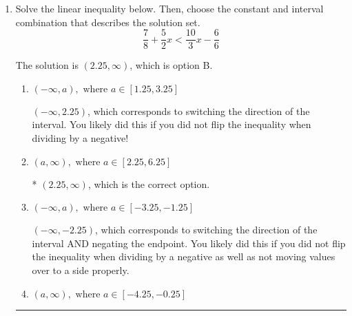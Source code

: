 \documentclass{extbook}[14pt]
\newcommand{\litem}[1]{\item #1

\rule{\textwidth}{0.4pt}}
\begin{document}
\begin{enumerate}
{\begin{enumerate}[label=\Alph*.]
$(3.80, -20.00]$, which is the correct interval but negatives of the actual endpoints.
\item \( (-\infty, a) \cup [b, \infty), \text{ where } a \in [0.8, 4.8] \text{ and } b \in [-23, -15] \)

$(-\infty, 3.80) \cup [-20.00, \infty)$, which corresponds to displaying the and-inequality as an or-inequality and getting negatives of the actual endpoints.
\item \( (-\infty, a] \cup (b, \infty), \text{ where } a \in [2.8, 4.8] \text{ and } b \in [-23, -17] \)

$(-\infty, 3.80] \cup (-20.00, \infty)$, which corresponds to displaying the and-inequality as an or-inequality AND flipping the inequality AND getting negatives of the actual endpoints.
\item \( \text{None of the above.} \)

* This is correct as the answer should be $(-3.80, 20.00]$.
\end{enumerate}

\textbf{General Comment:} To solve, you will need to break up the compound inequality into two inequalities. Be sure to keep track of the inequality! It may be best to draw a number line and graph your solution.
}
\litem{
Solve the linear inequality below. Then, choose the constant and interval combination that describes the solution set.
\[ \frac{7}{8} + \frac{5}{2} x < \frac{10}{3} x - \frac{6}{6} \]

The solution is \( (2.25, \infty) \), which is option B.\begin{enumerate}[label=\Alph*.]
\item \( (-\infty, a), \text{ where } a \in [1.25, 3.25] \)

 $(-\infty, 2.25)$, which corresponds to switching the direction of the interval. You likely did this if you did not flip the inequality when dividing by a negative!
\item \( (a, \infty), \text{ where } a \in [2.25, 6.25] \)

* $(2.25, \infty)$, which is the correct option.
\item \( (-\infty, a), \text{ where } a \in [-3.25, -1.25] \)

 $(-\infty, -2.25)$, which corresponds to switching the direction of the interval AND negating the endpoint. You likely did this if you did not flip the inequality when dividing by a negative as well as not moving values over to a side properly.
\item \( (a, \infty), \text{ where } a \in [-4.25, -0.25] \)


\end{enumerate}}
\end{enumerate}
\end{document}
